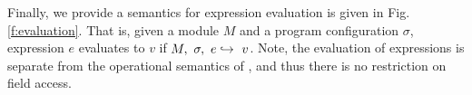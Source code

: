 Finally, we provide a semantics for expression evaluation is given in Fig. \ref{f:evaluation}. 
That is, given a module $M$ and a program configuration $\sigma$, expression $e$ evaluates to $v$
if $M,\ \sigma,\ e \hookrightarrow\ v$. Note, the evaluation of expressions is separate from the operational
semantics of \Loo, and thus there is no restriction on field access.

